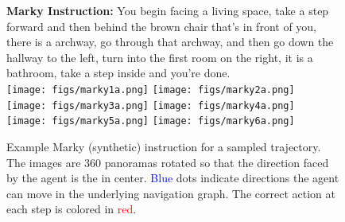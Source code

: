\begin{figure*}[h]
  \centering
  \textbf{Marky Instruction:} You begin facing a living space, take a step forward and then behind the brown chair that's in front of you, there is a archway, go through that archway, and then go down the hallway to the left, turn into the first room on the right, it is a bathroom, take a step inside and you're done.
  \vspace{1mm}\\
  \texttt{[image: figs/marky1a.png]}
  \texttt{[image: figs/marky2a.png]} \vspace{2mm}\\
  \texttt{[image: figs/marky3a.png]}
  \texttt{[image: figs/marky4a.png]} \vspace{2mm}\\
  \texttt{[image: figs/marky5a.png]}
  \texttt{[image: figs/marky6a.png]}
  \caption{Example Marky (synthetic) instruction for a sampled trajectory. The images are 360\degree{} panoramas rotated so that the direction faced by the agent is the in center. \textcolor{blue}{Blue} dots indicate directions the agent can move in the underlying navigation graph. The correct action at each step is colored in \textcolor{red}{red}.}
  \label{fig:marky2}
\end{figure*}









